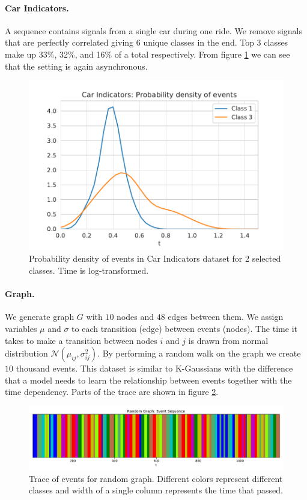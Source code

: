 \paragraph{Car Indicators.}
A sequence contains signals from a single car during one ride. We remove signals that are perfectly correlated giving 6 unique classes in the end. Top 3 classes make up 33\%, 32\%, and 16\% of a total respectively. From figure \ref{fig:car-indicators-density} we can see that the setting is again asynchronous.
\begin{figure}[H]
    \centering
    \includegraphics[width=0.35 \linewidth]{images/car-indicators-density.pdf}
    \caption{Probability density of events in Car Indicators dataset for 2 selected classes. Time is log-transformed.}\label{fig:car-indicators-density}
\end{figure}

\paragraph{Graph.}

We generate graph $G$ with $10$ nodes and $48$ edges between them. We assign variables $\mu$ and $\sigma$ to each transition (edge) between events (nodes). The time it takes to make a transition between nodes $i$ and $j$ is drawn from normal distribution $\mathcal{N}(\mu_{ij}, \sigma^2_{ij})$. By performing a random walk on the graph we create $10$ thousand events. This dataset is similar to K-Gaussians with the difference that a model needs to learn the relationship between events together with the time dependency. Parts of the trace are shown in figure \ref{fig:random-graph-trace}.
\begin{figure}[H]
    \centering
    \includegraphics[width=\linewidth]{images/random-graph-trace.pdf}
    \caption{Trace of events for random graph. Different colors represent different classes and width of a single column represents the time that passed.}\label{fig:random-graph-trace}
\end{figure}
